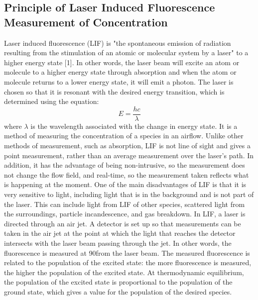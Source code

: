 \documentclass[preview,12pt]{article}
\begin{document}
\subsection*{Principle of Laser Induced Fluorescence Measurement of Concentration}
\indent Laser induced fluorescence (LIF) is "the spontaneous emission of radiation resulting from the stimulation of an atomic or molecular system by a laser" to a higher energy state [1].  In other words, the laser beam will excite an atom or molecule to a higher energy state through absorption and when the atom or molecule returns to a lower energy state, it will emit a photon.  The laser is chosen so that it is resonant with the desired energy transition, which is determined using the equation:
$$E=\frac{hc}{\lambda}$$
where $\lambda$ is the wavelength associated with the change in energy state.
It is a method of measuring the concentration of a species in an airflow.  Unlike other methods of measurement, such as absorption, LIF is not line of sight and gives a point measurement, rather than an average measurement over the laser's path.  In addition, it has the advantage of being non-intrusive, so the measurement does not change the flow field, and real-time, so the measurement taken reflects what is happening at the moment. One of the main disadvantages of LIF is that it is very sensitive to light, including light that is in the background and is not part of the laser.  This can include light from LIF of other species, scattered light from the surroundings, particle incandescence, and gas breakdown. \newline
\indent In LIF, a laser is directed through an air jet.  A detector is set up so that measurements can be taken in the air jet at the point at which the light that reaches the detector intersects with the laser beam passing through the jet. In other words, the fluorescence is measured at 90\degree  from the laser beam.  The measured fluorescence is related to the population of the excited state: the more fluorescence is measured, the higher the population of the excited state.  At thermodynamic equilibrium, the population of the excited state is proportional to the population of the ground state, which gives a value for the population of the desired species.
\end{document}
